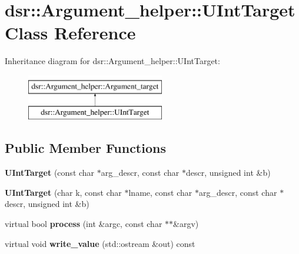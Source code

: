 \hypertarget{classdsr_1_1_argument__helper_1_1_u_int_target}{
\section{dsr::Argument\_\-helper::UIntTarget Class Reference}
\label{classdsr_1_1_argument__helper_1_1_u_int_target}
}
Inheritance diagram for dsr::Argument\_\-helper::UIntTarget:\begin{figure}[H]
\begin{center}
\leavevmode
\includegraphics[height=2.000000cm]{classdsr_1_1_argument__helper_1_1_u_int_target}
\end{center}
\end{figure}
\subsection*{Public Member Functions}
\begin{DoxyCompactItemize}
\item 
\hypertarget{classdsr_1_1_argument__helper_1_1_u_int_target_a3d9454fceac68d4271b3127a9846e38d}{
{\bfseries UIntTarget} (const char $\ast$arg\_\-descr, const char $\ast$descr, unsigned int \&b)}
\label{classdsr_1_1_argument__helper_1_1_u_int_target_a3d9454fceac68d4271b3127a9846e38d}

\item 
\hypertarget{classdsr_1_1_argument__helper_1_1_u_int_target_a65b049d566055fa7086be18a083a22f3}{
{\bfseries UIntTarget} (char k, const char $\ast$lname, const char $\ast$arg\_\-descr, const char $\ast$descr, unsigned int \&b)}
\label{classdsr_1_1_argument__helper_1_1_u_int_target_a65b049d566055fa7086be18a083a22f3}

\item 
\hypertarget{classdsr_1_1_argument__helper_1_1_u_int_target_a6ef1c90bb75d83f03adcf17b823509f5}{
virtual bool {\bfseries process} (int \&argc, const char $\ast$$\ast$\&argv)}
\label{classdsr_1_1_argument__helper_1_1_u_int_target_a6ef1c90bb75d83f03adcf17b823509f5}

\item 
\hypertarget{classdsr_1_1_argument__helper_1_1_u_int_target_aab39ece4f7160e8b74ca324505acc3ed}{
virtual void {\bfseries write\_\-value} (std::ostream \&out) const }
\label{classdsr_1_1_argument__helper_1_1_u_int_target_aab39ece4f7160e8b74ca324505acc3ed}

\end{DoxyCompactItemize}
